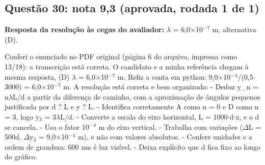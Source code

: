 \documentclass{article}%
\begin{document}
\subsection*{Questão 30: nota 9,3 (aprovada, rodada 1 de 1)}%
\textbf{Resposta da resolução às cegas do avaliador:} $\lambda$ = 6,0$\times$10$^{-}$$^{7}$ m, alternativa (D).\par %
Conferi o enunciado no PDF original (página 6 do arquivo, impressa como 13/18): a transcrição está correta. O candidato e a minha referência chegam à mesma resposta, (D) $\lambda$ = 6,0$\times$10$^{-}$$^{7}$ m. Refiz a conta em python: 9,0$\times$10$^{-}$$^{4}$/(0,5$\cdot$3000) = 6,0$\times$10$^{-}$$^{7}$ m.\newline%
\newline%
A resolução está correta e bem organizada:\newline%
{-} Deduz y\_n = n$\lambda$L/d a partir da diferença de caminho, com a aproximação de ângulos pequenos justificada por d ? L e y ? L.\newline%
{-} Identifica corretamente A como n = 0 e D como n = 3, logo y$_{3}$ = 3$\lambda$L/d.\newline%
{-} Converte a escala do eixo horizontal, L = 1000$\cdot$d$\cdot$x, e o d se cancela.\newline%
{-} Usa o fator 10$^{-}$$^{4}$ m do eixo vertical.\newline%
{-} Trabalha com variações ($\Delta$L = 500d, $\Delta$y$_{3}$ = 9,0$\times$10$^{-}$$^{4}$ m), e não com valores absolutos.\newline%
{-} Confere unidades e a ordem de grandeza: 600 nm é luz visível.\newline%
{-} Deixa explícito que d fica fixo ao longo do gráfico.\newline%
\newline%
\end{document}
